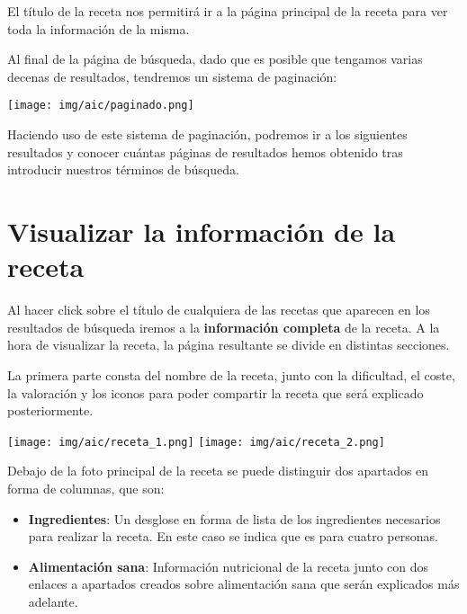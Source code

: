\documentclass{\ClassPath/viu-tfm-template}
\begin{document}
El título de la receta nos permitirá ir a la página principal de la receta para ver toda la información de la misma.

Al final de la página de búsqueda, dado que es posible que tengamos varias decenas de resultados, tendremos un sistema de paginación:

\begin{center}
    \vspace{-10pt}
    \texttt{[image: img/aic/paginado.png]}
    \vspace{-20pt}
\end{center}

Haciendo uso de este sistema de paginación, podremos ir a los siguientes resultados y conocer cuántas páginas de resultados hemos obtenido tras introducir nuestros términos de búsqueda.

\section{Visualizar la información de la receta}

Al  hacer click sobre el título de cualquiera de las recetas que aparecen en los resultados de búsqueda iremos a la \textbf{información completa} de la receta. A la hora de visualizar la receta, la página resultante se divide en distintas secciones.

La primera parte consta del nombre de la receta, junto con la dificultad, el coste, la valoración y los iconos para poder compartir la receta que será explicado posteriormente.


\begin{center}
    \vspace{-10pt}
    \texttt{[image: img/aic/receta\_1.png]}
    \texttt{[image: img/aic/receta\_2.png]}
    \vspace{-20pt}
\end{center}

Debajo de la foto principal de la receta se puede distinguir dos apartados en forma de columnas, que son:

\vspace{-1em}
\begin{itemize}
    \item \textbf{Ingredientes}: Un desglose en forma de lista de los ingredientes necesarios para realizar la receta. En este caso se indica que es para cuatro personas.
    \item \textbf{Alimentación sana}: Información nutricional de la receta junto con dos enlaces a apartados creados sobre alimentación sana que serán explicados más adelante.
\end{itemize}
\end{document}
